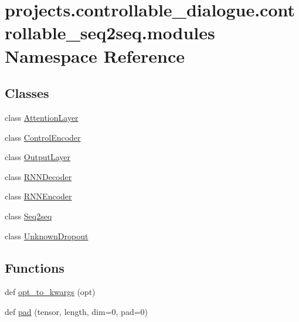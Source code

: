 \hypertarget{namespaceprojects_1_1controllable__dialogue_1_1controllable__seq2seq_1_1modules}{}\section{projects.\+controllable\+\_\+dialogue.\+controllable\+\_\+seq2seq.\+modules Namespace Reference}
\label{namespaceprojects_1_1controllable__dialogue_1_1controllable__seq2seq_1_1modules}
\subsection*{Classes}
\begin{DoxyCompactItemize}
\item 
class \hyperlink{classprojects_1_1controllable__dialogue_1_1controllable__seq2seq_1_1modules_1_1AttentionLayer}{Attention\+Layer}
\item 
class \hyperlink{classprojects_1_1controllable__dialogue_1_1controllable__seq2seq_1_1modules_1_1ControlEncoder}{Control\+Encoder}
\item 
class \hyperlink{classprojects_1_1controllable__dialogue_1_1controllable__seq2seq_1_1modules_1_1OutputLayer}{Output\+Layer}
\item 
class \hyperlink{classprojects_1_1controllable__dialogue_1_1controllable__seq2seq_1_1modules_1_1RNNDecoder}{R\+N\+N\+Decoder}
\item 
class \hyperlink{classprojects_1_1controllable__dialogue_1_1controllable__seq2seq_1_1modules_1_1RNNEncoder}{R\+N\+N\+Encoder}
\item 
class \hyperlink{classprojects_1_1controllable__dialogue_1_1controllable__seq2seq_1_1modules_1_1Seq2seq}{Seq2seq}
\item 
class \hyperlink{classprojects_1_1controllable__dialogue_1_1controllable__seq2seq_1_1modules_1_1UnknownDropout}{Unknown\+Dropout}
\end{DoxyCompactItemize}
\subsection*{Functions}
\begin{DoxyCompactItemize}
\item 
def \hyperlink{namespaceprojects_1_1controllable__dialogue_1_1controllable__seq2seq_1_1modules_a29bd74b29a327dc6c2d4a3aaa9ec3c08}{opt\+\_\+to\+\_\+kwargs} (opt)
\item 
def \hyperlink{namespaceprojects_1_1controllable__dialogue_1_1controllable__seq2seq_1_1modules_abdf83fbfd5a42f32b931c6fbae972dde}{pad} (tensor, length, dim=0, pad=0)
\end{DoxyCompactItemize}


